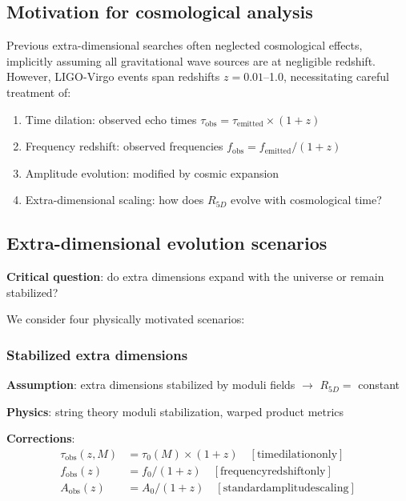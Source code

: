 \documentclass[12pt]{iopart}
\begin{document}
\subsection{Motivation for cosmological analysis}

Previous extra-dimensional searches often neglected cosmological effects, implicitly assuming all gravitational wave sources are at negligible redshift. However, LIGO-Virgo events span redshifts $z = 0.01$--1.0, necessitating careful treatment of:

\begin{enumerate}
\item Time dilation: observed echo times $\tau_{\mathrm{obs}} = \tau_{\mathrm{emitted}} \times (1+z)$
\item Frequency redshift: observed frequencies $f_{\mathrm{obs}} = f_{\mathrm{emitted}} / (1+z)$
\item Amplitude evolution: modified by cosmic expansion
\item Extra-dimensional scaling: how does $R_{5D}$ evolve with cosmological time?
\end{enumerate}

\subsection{Extra-dimensional evolution scenarios}

\textbf{Critical question}: do extra dimensions expand with the universe or remain stabilized?

We consider four physically motivated scenarios:

\subsubsection{Stabilized extra dimensions}

\textbf{Assumption}: extra dimensions stabilized by moduli fields $\to$ $R_{5D} = $ constant

\textbf{Physics}: string theory moduli stabilization, warped product metrics

\textbf{Corrections}:
\begin{eqnarray}
\tau_{\mathrm{obs}}(z,M) &= \tau_0(M) \times (1+z) \quad \mathrm{[time dilation only]} \\
f_{\mathrm{obs}}(z) &= f_0 / (1+z) \quad \mathrm{[frequency redshift only]} \\
A_{\mathrm{obs}}(z) &= A_0 / (1+z) \quad \mathrm{[standard amplitude scaling]}
\end{eqnarray}
\end{document}
